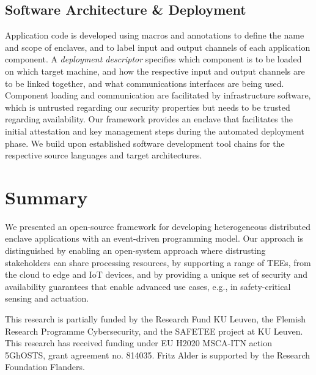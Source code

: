 \documentclass[sigconf]{acmart}
\begin{document}
\subsection{Software Architecture \& Deployment}

Application code is developed using macros and annotations to define the
name and scope of enclaves, and to label input and output channels of each
application component. A \emph{deployment descriptor} specifies which
component is to be loaded on which target machine, and how the respective
input and output channels are to be linked together, and what
communications interfaces are being used. Component loading and
communication are facilitated by infrastructure software, which is
untrusted regarding our security properties but needs to be trusted
regarding availability. Our framework provides an enclave that facilitates
the initial attestation and key management steps during the automated
deployment phase. We build upon established software development tool
chains for the respective source languages and target architectures.

\section{Summary}

We presented an open-source framework for developing heterogeneous
distributed enclave applications with an event-driven programming model.
Our approach is distinguished by enabling an open-system approach where
distrusting stakeholders can share processing resources, by supporting a
range of \acp{TEE}, from the cloud to edge and IoT devices, and by
providing a unique set of security and availability guarantees that enable
advanced use cases, e.g., in safety-critical sensing and actuation.

\begin{acks}
%
This research is partially funded by the Research Fund KU Leuven, the
Flemish Research Programme Cybersecurity, and the SAFETEE project at KU
Leuven. This research has received funding under EU H2020 MSCA-ITN action
5GhOSTS, grant agreement no. 814035. Fritz Alder is supported by the
Research Foundation Flanders.
%
\end{acks}



\end{document}
